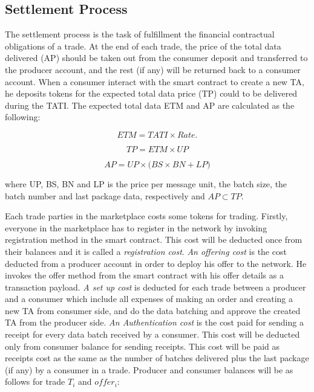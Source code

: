 \documentclass[letterpaper, 10 pt, conference]{ieeeconf}  %
\makeatletter
\newcommand{\mathleft}{\@fleqntrue\@mathmargin15pt}
\newcommand{\mynote}[1]{{\leavevmode\smaller\itshape\color{red}\{#1\}}}
\makeatother
\begin{document}
\subsection{Settlement Process}

The settlement process is the task of fulfillment the financial contractual obligations of a trade.
At the end of each trade, the price of the total data delivered (AP) should be taken out from the consumer deposit and transferred to the producer account,  and the rest (if any) will be returned back to a consumer account. When a consumer interact with the smart contract to create a new TA, he deposits tokens for the expected total data price (TP) could to be delivered during the TATI. The expected total data  ETM  and AP are calculated as the following:

\vspace{-0.2 cm}
\mathleft
\begin{equation}
\textbf {$ETM = TATI \times Rate. $}    
\end{equation}
 
\vspace{-0.5 cm}

\mathleft
\begin{equation}
\textbf {$TP = ETM \times UP $} 
\end{equation}

\vspace{-0.5 cm}

\mathleft
\begin{equation}
\textbf {$AP = UP \times \big(BS \times BN + LP\big)$} 
\end{equation}


where UP, BS, BN and LP is the price per message unit, the batch size, the batch number and last package data, respectively and $ AP \subset TP$.

Each trade parties in the marketplace costs some tokens for trading. Firstly, everyone in the marketplace has to register in the network by invoking registration method in the smart contract. This cost will be deducted once from their balances and it is called a \textit{registration cost}. \textit{ An offering cost} is the cost deducted from a producer account in order to deploy his offer to the network. He invokes the offer method from the smart contract with his offer details as a transaction payload. \textit{ A set up cost} is deducted for each trade between a producer and a consumer which include all expenses of making an order and creating a new TA from consumer side, and do the data batching and approve the created TA from the producer side. \textit{An Authentication cost} is the cost paid for sending a receipt for every data batch received by a consumer. This cost will be deducted only from consumer balance for sending receipts. This cost will be paid  as receipts cost as the same as the number of batches delivered plus the last package (if any) by a consumer in a trade. Producer and consumer balances will be as follows for trade $T_{i}$ and $offer_{i}$:
\end{document}
